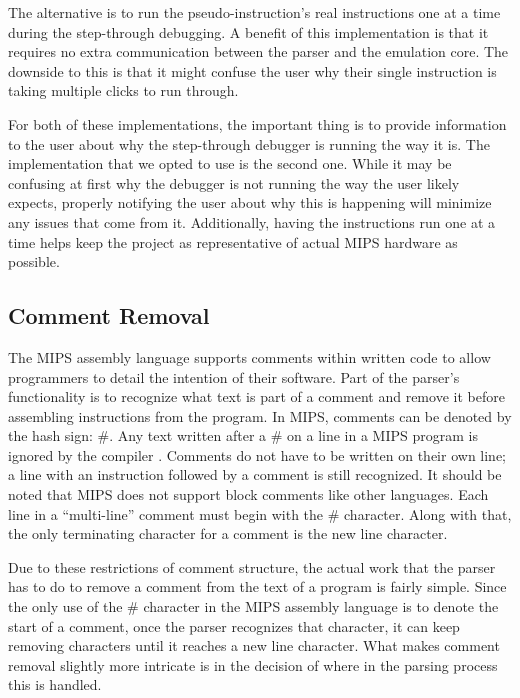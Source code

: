 \documentclass[
    paper=letter,
    parskip=half,
    fontsize=12pt,
    titlepage=firstiscover,
    toc=bibliography,
    numbers=endperiod
]{scrartcl}
\begin{document}
The alternative is to run the pseudo-instruction's real instructions one
at a time during the step-through debugging. A benefit of this
implementation is that it requires no extra communication between the
parser and the emulation core. The downside to this is that it might
confuse the user why their single instruction is taking multiple clicks
to run through.

For both of these implementations, the important thing is to provide
information to the user about why the step-through debugger is running
the way it is. The implementation that we opted to use is the second
one. While it may be confusing at first why the debugger is not running
the way the user likely expects, properly notifying the user about why
this is happening will minimize any issues that come from it.
Additionally, having the instructions run one at a time helps keep the
project as representative of actual MIPS hardware as possible.

\subsection{Comment Removal}

The MIPS assembly language supports comments within written code to
allow programmers to detail the intention of their software. Part of the
parser's functionality is to recognize what text is part of a comment
and remove it before assembling instructions from the program. In MIPS,
comments can be denoted by the hash sign: \#. Any text written after a
\# on a line in a MIPS program is ignored by the compiler
\cite{wikibooks-mips-instructions}. Comments do not have to be written
on their own line; a line with an instruction followed by a comment is
still recognized. It should be noted that MIPS does not support block
comments like other languages. Each line in a ``multi-line'' comment
must begin with the \# character. Along with that, the only terminating
character for a comment is the new line character.

Due to these restrictions of comment structure, the actual work that the
parser has to do to remove a comment from the text of a program is
fairly simple. Since the only use of the \# character in the MIPS
assembly language is to denote the start of a comment, once the parser
recognizes that character, it can keep removing characters until it
reaches a new line character. What makes comment removal slightly more
intricate is in the decision of where in the parsing process this is
handled.
\end{document}
